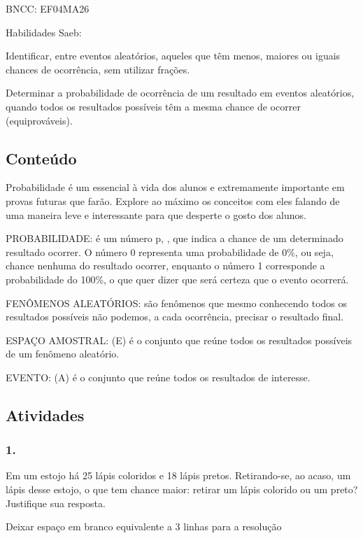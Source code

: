 BNCC: EF04MA26

Habilidades Saeb:

Identificar, entre eventos aleatórios, aqueles que têm menos, maiores ou
iguais chances de ocorrência, sem utilizar frações.

Determinar a probabilidade de ocorrência de um resultado em eventos
aleatórios, quando todos os resultados possíveis têm a mesma chance de
ocorrer (equiprováveis).

\subsection{Conteúdo}\label{conteuxfado-6}

\protect\hypertarget{_Hlk128408075}{}{}Probabilidade é um essencial à
vida dos alunos e extremamente importante em provas futuras que farão.
Explore ao máximo os conceitos com eles falando de uma maneira leve e
interessante para que desperte o gosto dos alunos.

PROBABILIDADE: é um número p, , que indica a chance de um determinado
resultado ocorrer. O número 0 representa uma probabilidade de 0\%, ou
seja, chance nenhuma do resultado ocorrer, enquanto o número 1
corresponde a probabilidade do 100\%, o que quer dizer que será certeza
que o evento ocorrerá.

FENÔMENOS ALEATÓRIOS: são fenômenos que mesmo conhecendo todos os
resultados possíveis não podemos, a cada ocorrência, precisar o
resultado final.

ESPAÇO AMOSTRAL: (E) é o conjunto que reúne todos os resultados
possíveis de um fenômeno aleatório.

EVENTO: (A) é o conjunto que reúne todos os resultados de interesse.

\subsection{Atividades}\label{atividades-6}

\subsubsection{1.}\label{section-78}

Em um estojo há 25 lápis coloridos e 18 lápis pretos. Retirando-se, ao
acaso, um lápis desse estojo, o que tem chance maior: retirar um lápis
colorido ou um preto? Justifique sua resposta.

Deixar espaço em branco equivalente a 3 linhas para a resolução


